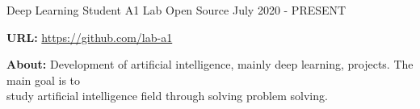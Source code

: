 
\begin{cventries}

	\cventry
	{Deep Learning Student} %
	{A1 Lab} %
	{Open Source} %
	{July 2020 - PRESENT} %
	{
		\begin{cvitems} %
			\item {\textbf{URL:} \href{https://github.com/dl4all}{https://github.com/lab-a1}}
			\item {\textbf{About:} Development of artificial intelligence, mainly deep learning, projects. The main goal is to\\study artificial intelligence field through solving problem solving.}
		\end{cvitems}
	}
\end{cventries}
